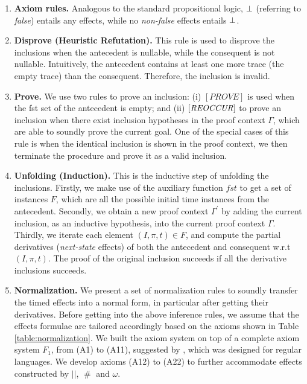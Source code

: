 \documentclass[acmsmall,10pt,review]{acmart}
\newcommand{\code}[1]{{\tt{\ensuremath{\m{#1}}}}}
\newcommand{\codeme}[1]{{\tt{\ensuremath{#1}}}}
\newcommand{\bott}{\textcolor{black}{\ensuremath{\bot}}}
\newcommand{\m}{\mathit}
\newcommand{\mysharp}{{\mathrel{\texttt{\#}}}}
\newcommand\tabref[1]{Table \textcolor{black}{\ref{#1}}.}
\begin{document}
{\begin{enumerate}
\item 
\textbf{Axiom rules.}
\label{Base}
Analogous to  the standard propositional logic, \code{\bott} (referring to \textit{false}) entails any effects, while no \textit{non-false} effects entails \code{\bott}.


\item 
\textbf{Disprove (Heuristic Refutation).}
\label{Refutation}
This rule is used to disprove the inclusions when the antecedent is nullable, while the consequent is not nullable. Intuitively, the antecedent contains at least one more trace (the empty trace) than the consequent. Therefore, the inclusion is invalid. 

\vspace{-4mm}


\item 
\textbf{Prove.}
\label{Prove}
We use two rules to prove an inclusion: (i) \codeme{[PROVE]} is used when the fst set of the antecedent is empty; and (ii) $\code{[REOCCUR]}$ to prove an inclusion
when there exist inclusion hypotheses 
in the proof context $\m{\Gamma}$, which are able to soundly prove the current goal. One of the special cases of this rule is when the identical inclusion is shown in the proof context, we then terminate the procedure and prove it as a valid inclusion. 


\item 
\textbf{Unfolding (Induction).}
\label{unfolding}
This is the inductive step of unfolding the inclusions. Firstly, we make use of the auxiliary function \code{fst} to get a set of instances \code{F}, which are all the possible initial time instances from the antecedent. 
Secondly, we obtain a new proof context \code{\Gamma^\prime} by adding the current inclusion, as an inductive hypothesis, into the current proof context \code{\Gamma}. 
Thirdly, we iterate each element \code{(I, \pi, t) \in F}, and compute the partial derivatives (\emph{next-state} effects) of both the antecedent and consequent w.r.t \code{(I, \pi, t)}. The proof of the original inclusion succeeds if all the derivative inclusions succeeds.



\item 
\textbf{Normalization.}
We present a set of normalization rules to soundly transfer the timed effects into a normal form, in particular after getting their derivatives. 
Before getting into the above inference rules, we assume that the effects formulae are tailored accordingly based on the axioms shown in
\tabref{table:normalization}
We built the axiom system on top of a complete axiom system \code{F_1}, from (A1) to (A11), suggested by \cite{DBLP:journals/jacm/Salomaa66}, which was designed for regular languages. We develop axioms (A12) to (A22) to further accommodate effects constructed by \code{||},   \code{\mysharp } and \code{\omega}.




\end{enumerate}}
\end{document}
